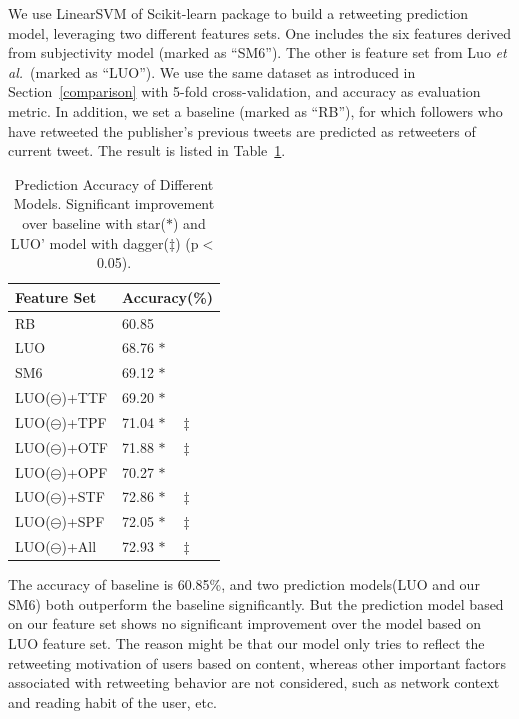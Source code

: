 \documentclass[smallcondensed]{svjour3}     %
\begin{document}
We use LinearSVM of Scikit-learn package to build a retweeting prediction model, leveraging two different features sets. One includes the six features derived from subjectivity model  (marked as ``SM6''). The other is feature set from Luo \emph{et al.}~\cite{Luo:2013RMF}(marked as ``LUO''). We use the same dataset as introduced in Section~\ref{comparison} with 5-fold cross-validation, and accuracy as evaluation metric.
In addition, we set a baseline (marked as ``RB''), for which followers who have retweeted the publisher's previous tweets are predicted as retweeters of current tweet. 
The result is listed in Table~\ref{table2}.
\begin{table}
\centering
\caption{Prediction Accuracy of Different Models. Significant improvement over baseline with star($ \ast $) and LUO' model with dagger($ \ddagger $) (p$ < $0.05).}
\label{table2}
\begin{tabular}{|l|l|}
\hline
Feature Set & Accuracy(\%) \\
\hline
RB & 60.85  \\
LUO & 68.76 $ \ast  $\\
SM6 & 69.12  $ \ast $ \\
LUO($ \ominus $)+TTF & 69.20  $ \ast $ \\
LUO($ \ominus $)+TPF & 71.04  $ \ast \quad \ddagger $ \\
LUO($ \ominus $)+OTF & 71.88  $ \ast \quad \ddagger $ \\
LUO($ \ominus $)+OPF & 70.27  $ \ast $ \\
LUO($ \ominus $)+STF & 72.86  $ \ast \quad \ddagger $ \\
LUO($ \ominus $)+SPF & 72.05  $ \ast \quad \ddagger $ \\
LUO($ \ominus $)+All & 72.93  $ \ast \quad \ddagger $ \\
\hline
\end{tabular}
\end{table}
The accuracy of baseline is 60.85\%, and two prediction models(LUO and our SM6) both outperform the baseline significantly. 
But the prediction model based on our feature set shows no significant improvement over the model based on LUO feature set. 
The reason might be that our model only tries to reflect the retweeting motivation of users based on content, whereas other important factors associated with retweeting behavior are not considered, such as network context and reading habit of the user, etc. 
\end{document}
